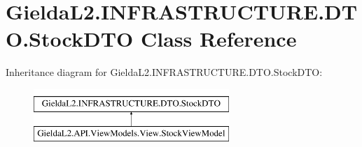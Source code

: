 \hypertarget{class_gielda_l2_1_1_i_n_f_r_a_s_t_r_u_c_t_u_r_e_1_1_d_t_o_1_1_stock_d_t_o}{}\section{Gielda\+L2.\+I\+N\+F\+R\+A\+S\+T\+R\+U\+C\+T\+U\+R\+E.\+D\+T\+O.\+Stock\+D\+TO Class Reference}
\label{class_gielda_l2_1_1_i_n_f_r_a_s_t_r_u_c_t_u_r_e_1_1_d_t_o_1_1_stock_d_t_o}
Inheritance diagram for Gielda\+L2.\+I\+N\+F\+R\+A\+S\+T\+R\+U\+C\+T\+U\+R\+E.\+D\+T\+O.\+Stock\+D\+TO\+:\begin{figure}[H]
\begin{center}
\leavevmode
\includegraphics[height=2.000000cm]{class_gielda_l2_1_1_i_n_f_r_a_s_t_r_u_c_t_u_r_e_1_1_d_t_o_1_1_stock_d_t_o}
\end{center}
\end{figure}
